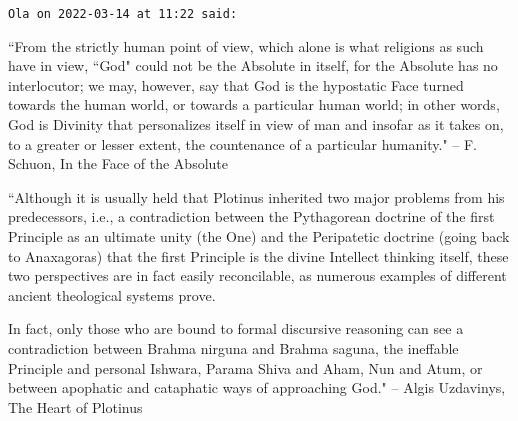 \begin{footnotesize}
\begin{sffamily}
\hfill

\texttt{Ola on 2022-03-14 at 11:22 said: }

``From the strictly human point of view, which alone is what religions as such have in view, ``God" could not be the Absolute in itself, for the Absolute has no interlocutor; we may, however, say that God is the hypostatic Face turned towards the human world, or towards a particular human world; in other words, God is Divinity that personalizes itself in view of man and insofar as it takes on, to a greater or lesser extent, the countenance of a particular humanity." – F. Schuon, In the Face of the Absolute

``Although it is usually held that Plotinus inherited two major problems from his predecessors, i.e., a contradiction between the Pythagorean doctrine of the first Principle as an ultimate unity (the One) and the Peripatetic doctrine (going back to Anaxagoras) that the first Principle is the divine Intellect thinking itself, these two perspectives are in fact easily reconcilable, as numerous examples of different ancient theological systems prove.

In fact, only those who are bound to formal discursive reasoning can see a contradiction between Brahma nirguna and Brahma saguna, the ineffable Principle and personal Ishwara, Parama Shiva and Aham, Nun and Atum, or between apophatic and cataphatic ways of approaching God." – Algis Uzdavinys, The Heart of Plotinus

\end{sffamily}\end{footnotesize}

